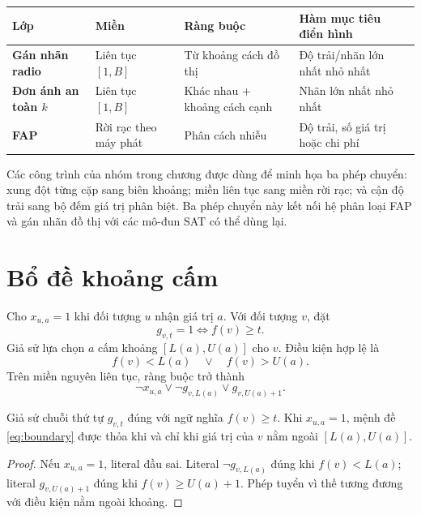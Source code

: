 \begin{center}
\label{tab:labeling-fap-classes}
\begin{tabularx}{\textwidth}{@{}>{\bfseries\sffamily}p{}YYY@{}}
\toprule
Lớp & Miền & Ràng buộc & Hàm mục tiêu điển hình\\
\midrule
Gán nhãn radio & Liên tục \([1,B]\) & Từ khoảng cách đồ thị & Độ trải/nhãn lớn nhất nhỏ nhất\\
Đơn ánh an toàn \(k\) & Liên tục \([1,B]\) & Khác nhau + khoảng cách cạnh &
Nhãn lớn nhất nhỏ nhất\\
FAP & Rời rạc theo máy phát & Phân cách nhiễu &
Độ trải, số giá trị hoặc chi phí\\
\bottomrule
\end{tabularx}
\end{center}

Các công trình của nhóm trong chương được dùng để minh họa ba phép chuyển:
xung đột từng cặp sang biên khoảng; miền liên tục sang miền rời rạc; và cận độ
trải sang bộ đếm giá trị phân biệt. Ba phép chuyển này kết nối hệ phân loại FAP
và gán nhãn đồ thị với các mô-đun SAT có thể dùng lại.

\section{Bổ đề khoảng cấm}

Cho \(x_{u,a}=1\) khi đối tượng \(u\) nhận giá trị \(a\). Với đối tượng \(v\),
đặt
\[
  g_{v,t}=1\iff f(v)\ge t.
\]
Giả sử lựa chọn \(a\) cấm khoảng \([L(a),U(a)]\) cho \(v\). Điều kiện hợp lệ
là
\[
  f(v)<L(a)
  \quad\lor\quad
  f(v)>U(a).
\]
Trên miền nguyên liên tục, ràng buộc trở thành
\[
  \neg x_{u,a}
  \lor
  \neg g_{v,L(a)}
  \lor
  g_{v,U(a)+1}.
  \tag{11.1}\label{eq:boundary}
\]

\begin{lemma}\label{lem:boundary}
Giả sử chuỗi thứ tự \(g_{v,t}\) đúng với ngữ nghĩa
\(f(v)\ge t\). Khi \(x_{u,a}=1\), mệnh đề
\eqref{eq:boundary} được thỏa khi và chỉ khi giá trị của \(v\) nằm ngoài
\([L(a),U(a)]\).
\end{lemma}

\begin{proof}
Nếu \(x_{u,a}=1\), literal đầu sai. Literal
\(\neg g_{v,L(a)}\) đúng khi \(f(v)<L(a)\); literal
\(g_{v,U(a)+1}\) đúng khi \(f(v)\ge U(a)+1\). Phép
tuyển vì thế tương đương với điều kiện nằm ngoài khoảng.
\end{proof}

